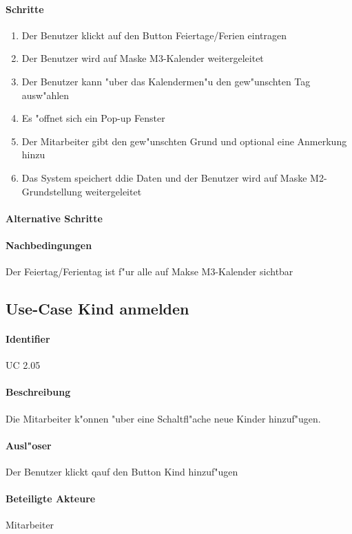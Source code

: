   \paragraph{Schritte}
  \begin{enumerate}
   \item Der Benutzer klickt auf den Button \dq Feiertage/Ferien eintragen\dq
   \item Der Benutzer wird auf Maske M3-Kalender weitergeleitet
   \item Der Benutzer kann "uber das Kalendermen"u den gew"unschten Tag ausw"ahlen
   \item Es "offnet sich ein Pop-up Fenster
   \item Der Mitarbeiter gibt den gew"unschten Grund und optional eine Anmerkung hinzu
   \item Das System speichert ddie Daten und der Benutzer wird auf Maske M2-Grundstellung weitergeleitet
  \end{enumerate}

  \paragraph{Alternative Schritte}
  \paragraph{Nachbedingungen}
  Der Feiertag/Ferientag ist f"ur alle auf Makse M3-Kalender sichtbar

  
 \newpage
 \subsection{Use-Case Kind anmelden}
  \paragraph{Identifier}
  UC 2.05
  \paragraph{Beschreibung}
    Die Mitarbeiter k"onnen "uber eine Schaltfl"ache neue Kinder hinzuf"ugen.
  \paragraph{Ausl"oser}
    Der Benutzer klickt qauf den Button \dq Kind hinzuf"ugen\dq
  \paragraph{Beteiligte Akteure}   \leavevmode \newline
    Mitarbeiter
